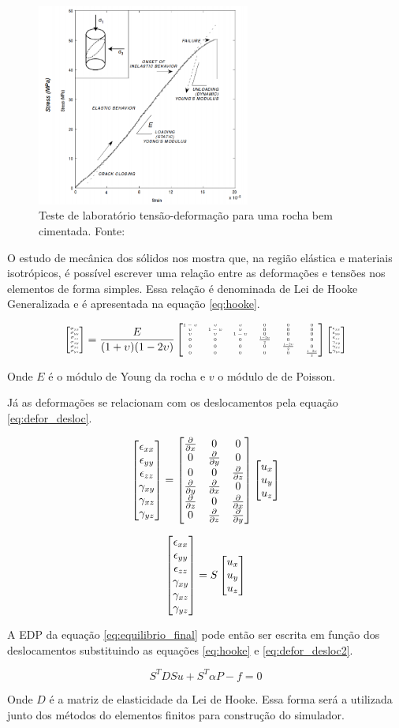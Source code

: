 \begin{figure}[!htbp]
\label{fig:stress_strain}
\centering
\includegraphics[width=7cm]{chap01/stress_strain.PNG}
\caption{Teste de laboratório tensão-deformação para uma rocha bem cimentada. Fonte: \cite{ResGeomec}}
\end{figure}


O estudo de mecânica dos sólidos nos mostra que, na região elástica e materiais isotrópicos, é possível escrever uma relação entre as deformações e tensões nos elementos de forma simples. Essa relação é denominada de Lei de Hooke Generalizada e é apresentada na equação \ref{eq:hooke}.


\begin{equation}{
\label{eq:hooke}
\fontsize{4}{4}\selectfont
\stvetor = \elastic \evetor
}
\end{equation}

Onde $E$ é o módulo de Young da rocha e $v$ o módulo de de Poisson.

Já as deformações se relacionam com os deslocamentos pela equação \ref{eq:defor_desloc}.

\begin{equation}
\label{eq:defor_desloc}
\evetor = \sop \uvetor
\end{equation}

\begin{equation}
\label{eq:defor_desloc2}
\evetor = S \uvetor
\end{equation}

A EDP da equação \ref{eq:equilibrio_final} pode então ser escrita em função dos deslocamentos substituindo as equações \ref{eq:hooke} e \ref{eq:defor_desloc2}.

\begin{equation}
\label{eq:edp_geomec}
S^TDS u + S^T\alpha P - f = 0
\end{equation}

Onde $D$ é a matriz de elasticidade da Lei de Hooke. Essa forma será a utilizada junto dos métodos do elementos finitos para construção do simulador.



